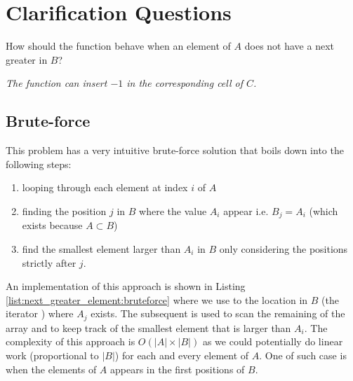 \section{Clarification Questions}

\begin{QandA}
	\item \begin{questionitem} \begin{question} How should the function behave when an element of $A$ does not have a next greater in $B$?  \end{question} 	 
    \begin{answered}
		\textit{The function can insert $-1$ in the corresponding cell of $C$.}
	\end{answered} \end{questionitem}
	
\end{QandA}

\subsection{Brute-force}
\label{next_greater_element:sec:bruteforce}
This problem has a very intuitive brute-force solution that boils down into the following steps:
\begin{enumerate}
	\item looping through each element at index $i$ of $A$
	\item finding the position $j$ in $B$ where the value $A_i$ appear i.e. $B_j = A_i$ (which
	exists because $A \subset B$)
	\item find the smallest element larger than $A_i$ in $B$ only considering the positions strictly
	after $j$.
\end{enumerate}
An implementation of this approach is shown in Listing \ref{list:next_greater_element:bruteforce}
where we use  to the location in $B$ (the iterator ) where $A_j$
exists. The subsequent  is used to scan the remaining of the array and to keep track
of the smallest element that is larger than $A_i$. The complexity of this approach is $O(|A| \times
|B|)$ as we could potentially do linear  work (proportional to $|B|$) for each and every element of
$A$. One of such case is when the elements of $A$ appears in the first positions of $B$. 




